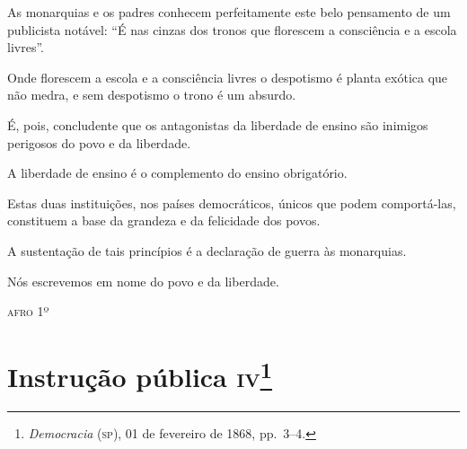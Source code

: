 As monarquias e os padres conhecem perfeitamente este belo pensamento de
um publicista notável: ``É nas cinzas dos tronos que florescem a
consciência e a escola livres''.

Onde florescem a escola e a consciência livres o despotismo é planta
exótica que não medra, e sem despotismo o trono é um absurdo.

É, pois, concludente que os antagonistas da liberdade de ensino são
inimigos perigosos do povo e da liberdade.

A liberdade de ensino é o complemento do ensino obrigatório.

Estas duas instituições, nos países democráticos, únicos que podem
comportá-las, constituem a base da grandeza e da felicidade dos povos.

A sustentação de tais princípios é a declaração de guerra às monarquias.

Nós escrevemos em nome do povo e da liberdade.

\begin{flushright}
\textsc{afro} 1º
\end{flushright}

\chapter{Instrução pública \textsc{iv}\footnote{\emph{Democracia} (\textsc{sp}),
  01 de fevereiro de 1868, pp.~3--4.}} %

